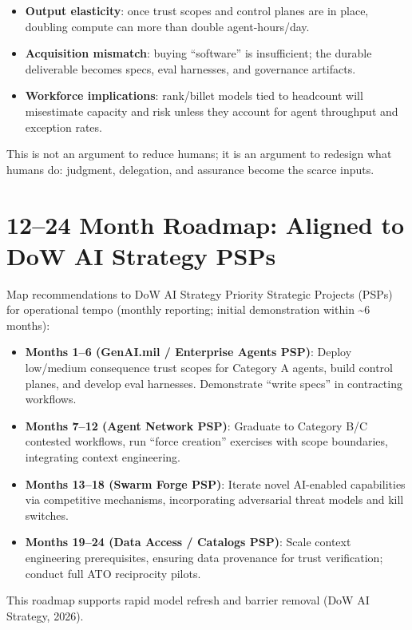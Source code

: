 \documentclass[11pt]{article}
\begin{document}
\begin{itemize}
\item \textbf{Output elasticity}: once trust scopes and control planes are in place, doubling compute can more than double agent-hours/day.
\item \textbf{Acquisition mismatch}: buying ``software'' is insufficient; the durable deliverable becomes specs, eval harnesses, and governance artifacts.
\item \textbf{Workforce implications}: rank/billet models tied to headcount will misestimate capacity and risk unless they account for agent throughput and exception rates.
\end{itemize}

This is not an argument to reduce humans; it is an argument to redesign what humans do: judgment, delegation, and assurance become the scarce inputs.


\section{12--24 Month Roadmap: Aligned to DoW AI Strategy PSPs}\label{12--24-month-roadmap-aligned-to-dod-ai-strategy-psps}

Map recommendations to DoW AI Strategy Priority Strategic Projects (PSPs) for operational tempo (monthly reporting; initial demonstration within \textasciitilde6 months):

\begin{itemize}
\item
  \textbf{Months 1--6 (GenAI.mil / Enterprise Agents PSP)}: Deploy low/medium consequence trust scopes for Category A agents, build control planes, and develop eval harnesses. Demonstrate ``write specs'' in contracting workflows.
\item
  \textbf{Months 7--12 (Agent Network PSP)}: Graduate to Category B/C contested workflows, run ``force creation'' exercises with scope boundaries, integrating context engineering.
\item
  \textbf{Months 13--18 (Swarm Forge PSP)}: Iterate novel AI-enabled capabilities via competitive mechanisms, incorporating adversarial threat models and kill switches.
\item
  \textbf{Months 19--24 (Data Access / Catalogs PSP)}: Scale context engineering prerequisites, ensuring data provenance for trust verification; conduct full ATO reciprocity pilots.
\end{itemize}

This roadmap supports rapid model refresh and barrier removal (DoW AI Strategy, 2026).
\end{document}
